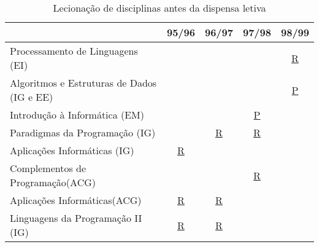 \documentclass[11pt]{article}
\begin{document}
\begin{table}[h]
\scriptsize
\centering
    \begin{tabular}[h]{|l||c|c|c|c|}
      \hline
& 95/96 & 96/97 & 97/98 & 98/99\\
\hline
\hline
Processamento de Linguagens (EI) & & & & \href{run:Disciplinas/Fichas/PL9899.pdf}{R} \\
\hline
Algoritmos e Estruturas de Dados (IG e EE) & & & & \href{run:Disciplinas/Fichas/AED9899EEP.pdf}{P}\\
\hline
Introdução à Informática (EM) & & & \href{run:Disciplinas/Fichas/II9798P.pdf}{P} &\\
\hline
Paradigmas da Programação (IG) & & \href{run:Disciplinas/Fichas/PP9697.pdf}{R} & \href{run:Disciplinas/Fichas/PP9798.pdf}{R} &\\
\hline
Aplicações Informáticas (IG) & \href{run:Disciplinas/Fichas/APLICINF9596IG.pdf}{R} & & &\\
\hline
Complementos de Programação(ACG) & & & \href{run:Disciplinas/Fichas/CP9798.pdf}{R} &\\
\hline
Aplicações Informáticas(ACG) & \href{run:Disciplinas/Fichas/AplicInf9596.pdf}{R} & \href{run:Disciplinas/Fichas/AplicInf9697.pdf}{R} & &\\
\hline
Linguagens da Programação II (IG) & \href{run:Disciplinas/Fichas/LPII9596.pdf}{R} & \href{run:Disciplinas/Fichas/LPII9697.pdf}{R} & &\\
\hline
\end{tabular}
    \caption{Lecionação de disciplinas antes da dispensa letiva}
    \label{disciplinas1}
\normalsize
\end{table}
\end{document}
